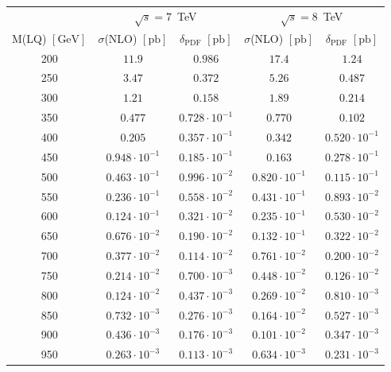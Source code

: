 \begin{table}
  \centering
  \begin{tabular}{c|cc|cc}
    & \multicolumn{2}{c|}{$\sqrt{s} = 7$~TeV} & \multicolumn{2}{c}{$\sqrt{s} = 8$~TeV} \\
    M(LQ) $[\text{GeV}]$ & $\sigma$(NLO) $[\text{pb}]$ & $\delta_{\text{PDF}}$ $[\text{pb}]$& $\sigma$(NLO) $[\text{pb}]$& $\delta_{\text{PDF}}$ $[\text{pb}]$ \\
    \hline\hline
    200  & $11.9$               & $0.986$               & $17.4$  & $1.24$  \\
    250  & $3.47$               & $0.372$               & $5.26$  & $0.487$  \\
    300  & $1.21$               & $0.158$               & $1.89$  & $0.214$  \\
    350  & $0.477$              & $0.728 \cdot 10^{-1}$ & $0.770$  & $0.102$ \\
    400  & $0.205$              & $0.357 \cdot 10^{-1}$ & $0.342$  & $0.520 \cdot 10^{-1}$ \\
    450  & $0.948 \cdot 10^{-1}$ & $0.185 \cdot 10^{-1}$ & $0.163$  & $0.278 \cdot 10^{-1}$ \\
    500  & $0.463 \cdot 10^{-1}$ & $0.996 \cdot 10^{-2}$ & $0.820 \cdot 10^{-1}$ & $0.115 \cdot 10^{-1}$ \\
    550  & $0.236 \cdot 10^{-1}$ & $0.558 \cdot 10^{-2}$ & $0.431 \cdot 10^{-1}$ & $0.893 \cdot 10^{-2}$ \\
    600  & $0.124 \cdot 10^{-1}$ & $0.321 \cdot 10^{-2}$ & $0.235 \cdot 10^{-1}$ & $0.530 \cdot 10^{-2}$ \\
    650  & $0.676 \cdot 10^{-2}$ & $0.190 \cdot 10^{-2}$ & $0.132 \cdot 10^{-1}$ & $0.322 \cdot 10^{-2}$ \\
    700  & $0.377 \cdot 10^{-2}$ & $0.114 \cdot 10^{-2}$ & $0.761 \cdot 10^{-2}$ & $0.200 \cdot 10^{-2}$ \\
    750  & $0.214 \cdot 10^{-2}$ & $0.700 \cdot 10^{-3}$ & $0.448 \cdot 10^{-2}$ & $0.126 \cdot 10^{-2}$ \\
    800  & $0.124 \cdot 10^{-2}$ & $0.437 \cdot 10^{-3}$ & $0.269 \cdot 10^{-2}$ & $0.810 \cdot 10^{-3}$ \\
    850  & $0.732 \cdot 10^{-3}$ & $0.276 \cdot 10^{-3}$ & $0.164 \cdot 10^{-2}$ & $0.527 \cdot 10^{-3}$ \\
    900  & $0.436 \cdot 10^{-3}$ & $0.176 \cdot 10^{-3}$ & $0.101 \cdot 10^{-2}$ & $0.347 \cdot 10^{-3}$ \\
    950  & $0.263 \cdot 10^{-3}$ & $0.113 \cdot 10^{-3}$ & $0.634 \cdot 10^{-3}$ & $0.231 \cdot 10^{-3}$ \\

\end{tabular}
\end{table}
